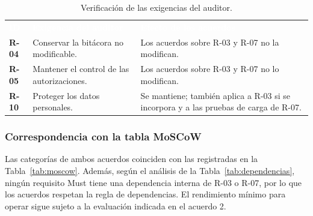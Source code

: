 \documentclass[12pt,a4paper]{article}
\newcommand{\cabecera}[1]{
    \textcolor{white}{\textbf{#1}}
}
\begin{document}
\begin{table}[H]
    \centering
    \small

    \begin{tabularx}{\textwidth}{C{1.2cm} L{5cm} Y}

        \cabecera{ID} &
        \cabecera{Exigencia del auditor} &
        \cabecera{Efecto de los acuerdos} \\

        \textbf{R-04} &
        Conservar la bitácora no modificable. &
        Los acuerdos sobre R-03 y R-07 no la modifican. \\

        \textbf{R-05} &
        Mantener el control de las autorizaciones. &
        Los acuerdos sobre R-03 y R-07 no lo modifican. \\

        \textbf{R-10} &
        Proteger los datos personales. &
        Se mantiene; también aplica a R-03 si se
        incorpora y a las pruebas de carga de R-07. \\

        \bottomrule

    \end{tabularx}

    \caption{Verificación de las exigencias del auditor.}
    \label{tab:verificacion-auditor}

\end{table}

\subsubsection{Correspondencia con la tabla MoSCoW}

Las categorías de ambos acuerdos coinciden con las
registradas en la Tabla~\ref{tab:moscow}.
Además, según el análisis de la
Tabla~\ref{tab:dependencias}, ningún requisito Must tiene
una dependencia interna de R-03 o R-07, por lo que los
acuerdos respetan la regla de dependencias. El rendimiento
mínimo para operar sigue sujeto a la evaluación indicada
en el acuerdo 2.
\end{document}
